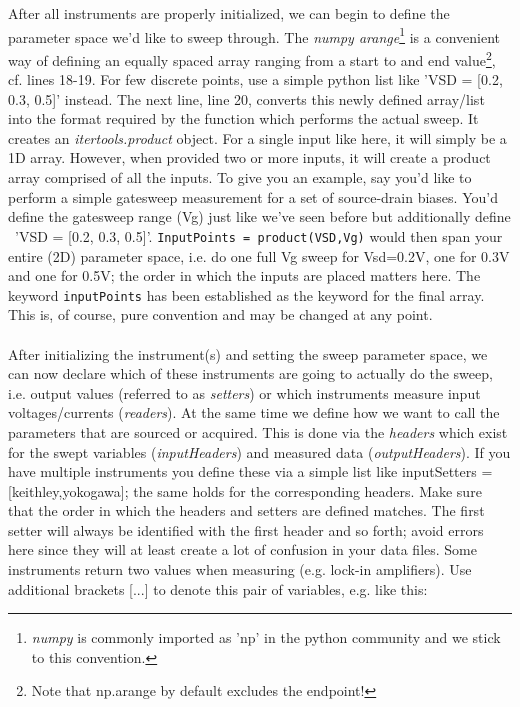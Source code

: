After all instruments are properly initialized, we can begin to define the parameter space we'd like to sweep through. The \textit{numpy arange}\footnote{\textit{numpy} is commonly imported as 'np' in the python community and we stick to this convention.} is a convenient way of defining an equally spaced array ranging from a start to and end value\footnote{Note that np.arange by default excludes the endpoint!}, cf. lines 18-19. For few discrete points, use a simple python list like 'VSD = [0.2, 0.3, 0.5]' instead. The next line, line 20, converts this newly defined array/list into the format required by the function which performs the actual sweep. It creates an \textit{itertools.product} object. For a single input like here, it will simply be a 1D array. However, when provided two or more inputs, it will create a product array comprised of all the inputs. To give you an example, say you'd like to perform a simple gatesweep measurement for a set of source-drain biases. You'd define the gatesweep range (Vg) just like we've seen before but additionally define ~'VSD = [0.2, 0.3, 0.5]'. \texttt{InputPoints = product(VSD,Vg)} would then span your entire (2D) parameter space, i.e. do one full Vg sweep for Vsd=0.2V, one for 0.3V and one for 0.5V; the order in which the inputs are placed matters here. The keyword \texttt{inputPoints} has been established as the keyword for the final array. This is, of course, pure convention and may be changed at any point.\\
\\
After initializing the instrument(s) and setting the sweep parameter space, we can now declare which of these instruments are going to actually do the sweep, i.e. output values (referred to as \textit{setters}) or which instruments measure input voltages/currents (\textit{readers}). At the same time we define how we want to call the parameters that are sourced or acquired. This is done via the \textit{headers} which exist for the swept variables (\textit{inputHeaders}) and measured data (\textit{outputHeaders}). If you have multiple instruments you define these via a simple list like inputSetters = [keithley,yokogawa]; the same holds for the corresponding headers. Make sure that the order in which the headers and setters are defined matches. The first setter will always be identified with the first header and so forth; avoid errors here since they will at least create a lot of confusion in your data files. Some instruments return two values when measuring (e.g. lock-in amplifiers). Use additional brackets [...] to denote this pair of variables, e.g. like this:
